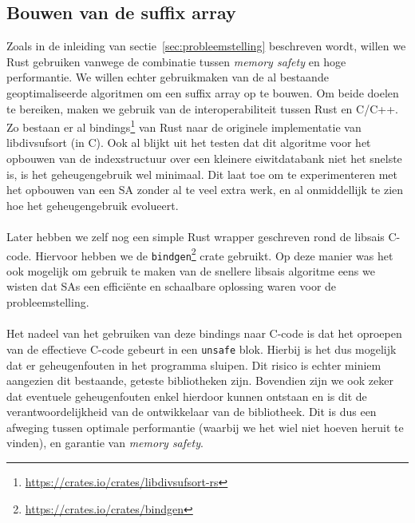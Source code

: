\subsection{Bouwen van de suffix array}\label{subsec:bouwen-van-de-suffix-array}
Zoals in de inleiding van sectie~\ref{sec:probleemstelling} beschreven wordt, willen we Rust gebruiken vanwege de combinatie tussen \textit{memory safety} en hoge performantie.
We willen echter gebruikmaken van de al bestaande geoptimaliseerde algoritmen om een suffix array op te bouwen.
Om beide doelen te bereiken, maken we gebruik van de interoperabiliteit tussen Rust en C/C++.
Zo bestaan er al bindings\footnote{\url{https://crates.io/crates/libdivsufsort-rs}} van Rust naar de originele implementatie van libdivsufsort\cite{libdivsufsort} (in C).
Ook al blijkt uit het testen dat dit algoritme voor het opbouwen van de indexstructuur over een kleinere eiwitdatabank niet het snelste is, is het geheugengebruik wel minimaal.
Dit laat toe om te experimenteren met het opbouwen van een SA zonder al te veel extra werk, en al onmiddellijk te zien hoe het geheugengebruik evolueert.
\\ \\
Later hebben we zelf nog een simple Rust wrapper geschreven rond de libsais C-code.
Hiervoor hebben we de \texttt{bindgen}\footnote{\url{https://crates.io/crates/bindgen}} crate gebruikt.
Op deze manier was het ook mogelijk om gebruik te maken van de snellere libsais algoritme eens we wisten dat SAs een efficiënte en schaalbare oplossing waren voor de probleemstelling.
\\ \\
Het nadeel van het gebruiken van deze bindings naar C-code is dat het oproepen van de effectieve C-code gebeurt in een \texttt{unsafe} blok.
Hierbij is het dus mogelijk dat er geheugenfouten in het programma sluipen.
Dit risico is echter miniem aangezien dit bestaande, geteste bibliotheken zijn.
Bovendien zijn we ook zeker dat eventuele geheugenfouten enkel hierdoor kunnen ontstaan en is dit de verantwoordelijkheid van de ontwikkelaar van de bibliotheek.
Dit is dus een afweging tussen optimale performantie (waarbij we het wiel niet hoeven heruit te vinden), en garantie van \textit{memory safety}.

